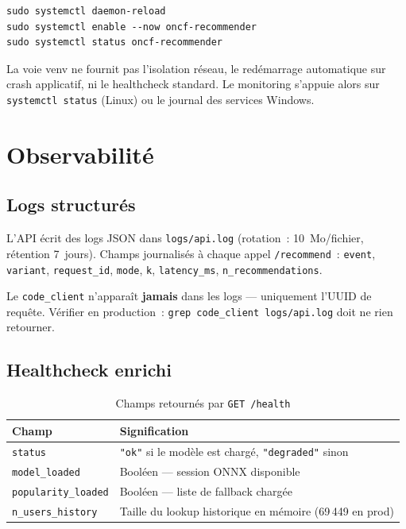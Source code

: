 \documentclass[12pt, a4paper]{report}
\begin{document}
\begin{lstlisting}[style=bash]
sudo systemctl daemon-reload
sudo systemctl enable --now oncf-recommender
sudo systemctl status oncf-recommender
\end{lstlisting}

\begin{tcolorbox}[infoBox, title=Différences avec Docker]
La voie venv ne fournit pas l'isolation réseau, le redémarrage automatique
sur crash applicatif, ni le healthcheck standard. Le monitoring s'appuie
alors sur \texttt{systemctl status} (Linux) ou le journal des services Windows.
\end{tcolorbox}

\section{Observabilité}

\subsection{Logs structurés}

L'API écrit des logs JSON dans \texttt{logs/api.log} (rotation~:
10~Mo/fichier, rétention 7~jours). Champs journalisés à chaque appel
\texttt{/recommend}~: \texttt{event}, \texttt{variant}, \texttt{request\_id},
\texttt{mode}, \texttt{k}, \texttt{latency\_ms}, \texttt{n\_recommendations}.

\begin{tcolorbox}[warnBox, title=Conformité Loi 09-08]
Le \texttt{code\_client} n'apparaît \textbf{jamais} dans les logs ---
uniquement l'UUID de requête. Vérifier en production~:
\texttt{grep code\_client logs/api.log} doit ne rien retourner.
\end{tcolorbox}

\subsection{Healthcheck enrichi}

\begin{table}[H]
\centering
\caption{Champs retournés par \texttt{GET /health}}
\begin{tabularx}{\linewidth}{|l|X|}
\hline
\textbf{Champ} & \textbf{Signification} \\
\hline
\texttt{status} & \texttt{"ok"} si le modèle est chargé, \texttt{"degraded"} sinon \\
\hline
\texttt{model\_loaded} & Booléen --- session ONNX disponible \\
\hline
\texttt{popularity\_loaded} & Booléen --- liste de fallback chargée \\
\hline
\texttt{n\_users\_history} & Taille du lookup historique en mémoire (69\,449 en prod) \\
\hline
\end{tabularx}
\end{table}
\end{document}
